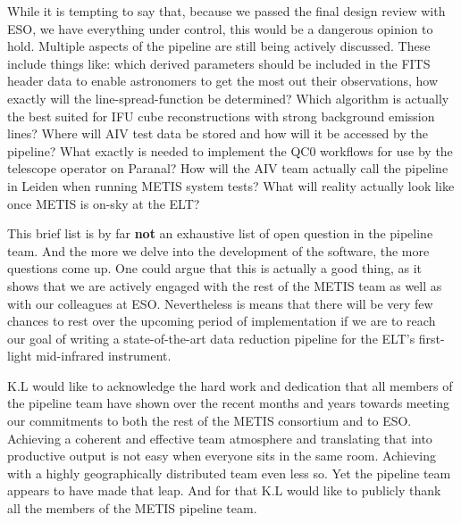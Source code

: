 \documentclass[a4paper]{spie}  %
\begin{document}
While it is tempting to say that, because we passed the final design review with ESO, we have everything under control, this would be a dangerous opinion to hold.
Multiple aspects of the pipeline are still being actively discussed. 
These include things like: which derived parameters should be included in the FITS header data to enable astronomers to get the most out their observations, how exactly will the line-spread-function be determined? Which algorithm is actually the best suited for IFU cube reconstructions with strong background emission lines? Where will AIV test data be stored and how will it be accessed by the pipeline? What exactly is needed to implement the QC0 workflows for use by the telescope operator on Paranal? How will the AIV team actually call the pipeline in Leiden when running METIS system tests? What will reality actually look like once METIS is on-sky at the ELT? 

This brief list is by far \textbf{not} an exhaustive list of open question in the pipeline team. 
And the more we delve into the development of the software, the more questions come up.
One could argue that this is actually a good thing, as it shows that we are actively engaged with the rest of the METIS team as well as with our colleagues at ESO.
Nevertheless is means that there will be very few chances to rest over the upcoming period of implementation if we are to reach our goal of writing a state-of-the-art data reduction pipeline for the ELT's first-light mid-infrared instrument.



\appendix    %

\acknowledgments %
K.L would like to acknowledge the hard work and dedication that all members of the pipeline team have shown over the recent months and years towards meeting our commitments to both the rest of the METIS consortium and to ESO. Achieving a coherent and effective team atmosphere and translating that into productive output is not easy when everyone sits in the same room. Achieving with a highly geographically distributed team even less so. Yet the pipeline team appears to have made that leap. And for that K.L would like to publicly thank all the members of the METIS pipeline team.




\end{document}
